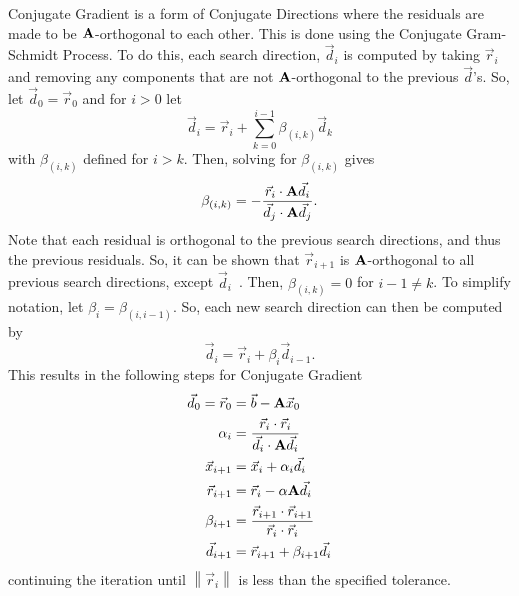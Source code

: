 Conjugate Gradient is a form of Conjugate Directions where the residuals are made to be \(\mathbf{A}\)-orthogonal to each other.
This is done using the Conjugate Gram-Schmidt Process.
To do this, each search direction, \(\vec{d}_i\) is computed by taking \(\vec{r}_i\) and removing any components that are not \(\mathbf{A}\)-orthogonal to the previous \(\vec{d}\)'s.
So, let \(\vec{d}_0 = \vec{r}_0\) and for \(i > 0\) let
\[
	\vec{d}_i = \vec{r}_i + \sum_{k=0}^{i-1} \beta_{(i,k)}\vec{d}_k
\]
with \(\beta_{(i,k)}\) defined for \(i > k\).
Then, solving for \(\beta_{(i,k)}\) gives
\[
	\beta_{(i,k)} = -\frac{\vec{r}_i\cdot\mathbf{A}\vec{d}_i}{\vec{d}_j\cdot\mathbf{A}\vec{d}_j}.
\]
Note that each residual is orthogonal to the previous search directions, and thus the previous residuals.
So, it can be shown that \(\vec{r}_{i+1}\) is \(\mathbf{A}\)-orthogonal to all previous search directions, except \(\vec{d}_i\)~\cite{Shewchuk:1994:IntroToCG}.
Then, \(\beta_{(i,k)} = 0\) for \(i-1 \neq k\).
To simplify notation, let \(\beta_i = \beta_{(i,i-1)}\).
So, each new search direction can then be computed by
\[
	\vec{d}_i = \vec{r}_i + \beta_i\vec{d}_{i-1}.
\]
This results in the following steps for Conjugate Gradient
\begin{align*}
	\vec{d}_0 = \vec{r}_0 &= \vec{b} - \mathbf{A}\vec{x}_0 \\
	\alpha_i &= \frac{\vec{r}_i\cdot\vec{r}_i}{\vec{d}_i\cdot \mathbf{A}\vec{d}_i} \\
	\vec{x}_{i+1} &= \vec{x}_i + \alpha_i\vec{d}_i \\
	\vec{r}_{i+1} &= \vec{r}_i - \alpha\mathbf{A}\vec{d}_i \\
	\beta_{i+1} &= \frac{\vec{r}_{i+1}\cdot\vec{r}_{i+1}}{\vec{r}_i\cdot\vec{r}_i} \\
	\vec{d}_{i+1} &= \vec{r}_{i+1} + \beta_{i+1}\vec{d}_i
\end{align*}
continuing the iteration until \(\left\|\vec{r}_i\right\|\) is less than the specified tolerance.

